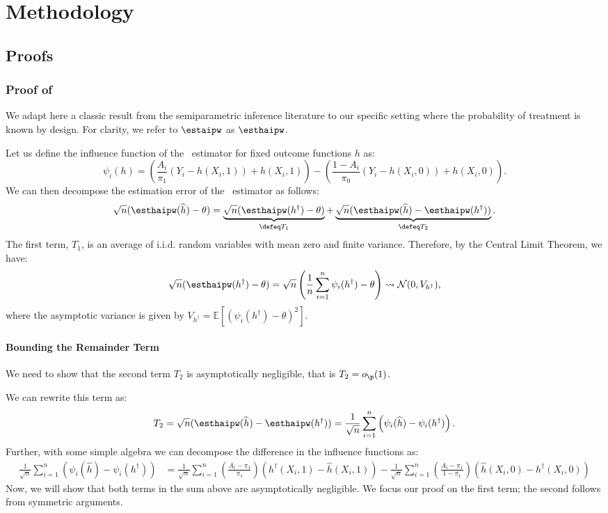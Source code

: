 \section{Methodology}

\subsection{Proofs}
\subsubsection{Proof of }
\label{apx:proofaipw}
We adapt here a classic result from the semiparametric inference literature to our specific setting where the probability of treatment is known by design. For clarity, we refer to $\estaipw$ as $\esthaipw$.

Let us define the influence function of the \aipw~estimator for fixed outcome functions $h$ as:
$$\psi_i(h) = \left(\frac{A_i}{\pi_1}(Y_i - h(X_i, 1)) + h(X_i,1)\right) - \left(\frac{1-A_i}{\pi_0}(Y_i - h(X_i,0)) + h(X_i,0)\right).$$
We can then decompose the estimation error of the \aipw~estimator as follows:
$$\sqrt{n}(\esthaipw(\widehat{h}) - \theta) = \underbrace{\sqrt{n}(\esthaipw(h^\dagger) - \theta)}_{\defeq T_1} + \underbrace{\sqrt{n}(\esthaipw(\widehat{h}) - \esthaipw(h^\dagger))}_{\defeq T_2}.$$
The first term, $T_1$, is an average of i.i.d. random variables with mean zero and finite variance. Therefore, by the Central Limit Theorem, we have:
$$\sqrt{n}(\esthaipw(h^\dagger) - \theta) = \sqrt{n}\left( \frac{1}{n} \sum_{i=1}^n \psi_i(h^\dagger) - \theta \right) \rightsquigarrow \mathcal{N}(0, V_{h^\dagger}),$$
 where the asymptotic variance is given by $V_{h^\dagger} = \mathbb{E}[(\psi_i(h^\dagger) - \theta)^2]$.

\paragraph{Bounding the Remainder Term}
We need to show that the second term $T_2$ is asymptotically negligible, that is $T_2= o_{\p}(1)$.

We can rewrite this term as:
$$T_2 = \sqrt{n}(\esthaipw(\widehat{h}) - \esthaipw(h^\dagger)) = \frac{1}{\sqrt{n}} \sum_{i=1}^n \left(\psi_i(\widehat{h}) - \psi_i(h^\dagger)\right).$$
Further, with some simple algebra we can decompose the difference in the influence functions as:
\begin{align*}
  \frac{1}{\sqrt{n}} \sum_{i=1}^n (\psi_i(\widehat{h}) - \psi_i(h^\dagger)) 
  &= \frac{1}{\sqrt{n}} \sum_{i=1}^n \left(\frac{A_i-\pi_1}{\pi_1}\right) (h^\dagger(X_i,1) - \widehat{h}(X_i,1)) - \frac{1}{\sqrt{n}} \sum_{i=1}^n \left(\frac{A_i-\pi_1}{1-\pi_1}\right) (\widehat{h}(X_i,0) - h^\dagger(X_i,0))
\end{align*}
 Now, we will show that both terms in the sum above are asymptotically negligible. We focus our proof on the first term; the second follows from symmetric arguments.

